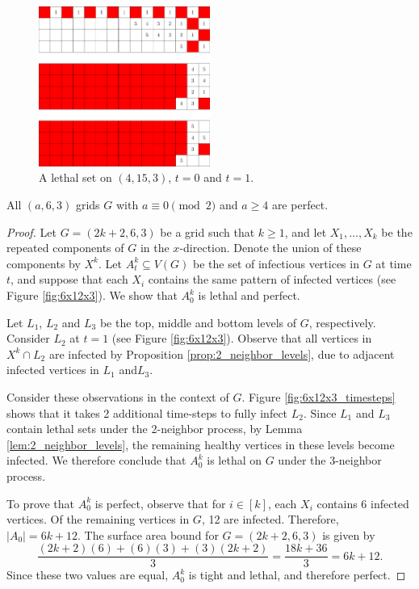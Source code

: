 \begin{figure}[]
\centering
\includegraphics[width=0.5\textwidth]{figures/7/4x15x3_timesteps_numbered_heatmap.pdf}
\caption{A lethal set on $(4,15,3)$, $t=0$ and $t=1$.}
\label{fig:4x15x3_timesteps}
\end{figure}

\begin{con}
\label{con:3x6xeven}
All $(a,6,3)$ grids $G$ with $a \equiv 0 \pmod 2$ and $a \geq 4$ are perfect. 
\end{con}

\begin{proof}
Let $G=(2k+2,6,3)$ be a grid such that $k \geq 1$, and let $X_1, \dots, X_{k}$ be the repeated components of $G$ in the $x$-direction. Denote the union of these components by $X^k$. Let $A_t^k \subseteq V(G)$ be the set of infectious vertices in $G$ at time $t$, and suppose that each $X_i$ contains the same pattern of infected vertices (see Figure \ref{fig:6x12x3}). We show that $A_0^k$ is lethal and perfect. 

Let $L_1$, $L_2$ and $L_3$ be the top, middle and bottom levels of $G$, respectively. Consider $L_2$ at $t=1$ (see Figure \ref{fig:6x12x3}). Observe that all vertices in $X^k \cap L_2$ are infected by Proposition \ref{prop:2_neighbor_levels}, due to adjacent infected vertices in $L_1$ and$L_3$. 

Consider these observations in the context of $G$. Figure \ref{fig:6x12x3_timesteps} shows that it takes 2 additional time-steps to fully infect $L_2$. Since $L_1$ and $L_3$ contain lethal sets under the 2-neighbor process, by Lemma \ref{lem:2_neighbor_levels}, the remaining healthy vertices in these levels become infected. We therefore conclude that $A_0^k$ is lethal on $G$ under the 3-neighbor process.

To prove that $A_0^k$ is perfect, observe that for $i \in [k]$, each $X_i$ contains 6 infected vertices. Of the remaining vertices in $G$, 12 are infected. Therefore, $|A_0| = 6k+12$. The surface area bound for $G=(2k+2,6,3)$ is given by
$$\frac{(2k+2)(6) + (6)(3) + (3)(2k+2)}{3} = \frac{18k + 36}{3} = 6k+12.$$
Since these two values are equal, $A_0^k$ is tight and lethal, and therefore perfect.
\end{proof}

